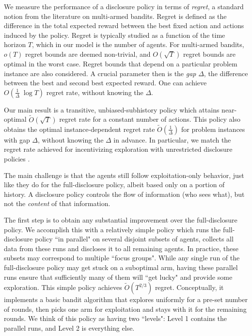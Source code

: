  We measure the performance of a disclosure policy in terms of \emph{regret}, a standard notion from the literature on multi-armed bandits. Regret is defined as the difference in the total expected reward between the best fixed action and actions induced by the policy. Regret is typically studied as a function of the time horizon $T$, which in our model is the number of agents. For multi-armed bandits, $o(T)$ regret bounds are deemed non-trivial, and $O(\sqrt{T})$ regret bounds are optimal in the worst case. Regret bounds that depend on a particular problem instance are also considered. A crucial parameter then is the \emph{gap} $\Delta$, the difference between the best and second best expected reward. One can achieve $O(\tfrac{1}{\Delta}\; \log T)$ regret rate, without knowing the $\Delta$.

Our main result is a transitive, unbiased-subhistory policy which attains near-optimal $\tilde{O}(\sqrt{T})$ regret rate for a constant number of actions. This policy also obtains the optimal instance-dependent regret rate
    $\tilde{O}(\tfrac{1}{\Delta})$
for problem instances with gap $\Delta$, without knowing the $\Delta$ in advance. In particular, we match the regret rate achieved for incentivizing exploration with unrestricted disclosure policies \citep{ICexploration-ec15-working}.

The main challenge is that the agents still follow exploitation-only behavior, just like they do for the full-disclosure policy, albeit based only on a portion of history. A disclosure policy controls the flow of information (who sees what), but not the \emph{content} of that information.

The first step is to obtain any substantial improvement over the full-disclosure policy. We accomplish this with a relatively simple policy which runs the full-disclosure policy ``in parallel" on several disjoint subsets of agents,  collects all data from these runs and discloses it to all remaining agents. In practice, these subsets may correspond to multiple ``focus groups". While any single run of the full-disclosure policy may get stuck on a suboptimal arm, having these parallel runs ensure that sufficiently many of them will ``get lucky" and provide some exploration. This simple policy achieves $\tilde{O}(T^{2/3})$ regret. Conceptually, it implements a basic bandit algorithm that explores uniformly for a pre-set number of rounds, then picks one arm for exploitation and stays with it for the remaining rounds. We think of this policy  as having two ``levels": Level 1 contains the parallel runs, and Level 2 is everything else.

